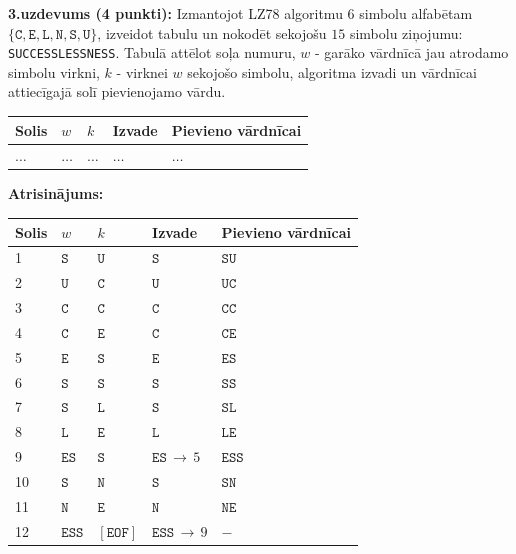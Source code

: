 \documentclass[11pt]{article}
\begin{document}
{\footnotesize
\vspace{6pt}
{\bf 3.uzdevums (4 punkti):}
Izmantojot LZ78 algoritmu 6 simbolu alfabētam $\{\mathtt{C}, \mathtt{E}, \mathtt{L}, \mathtt{N},\mathtt{S}, \mathtt{U}\}$,
izveidot tabulu un nokodēt sekojošu $15$ simbolu ziņojumu: {\tt SUCCESSLESSNESS}.
Tabulā attēlot soļa numuru, $w$ - garāko vārdnīcā jau atrodamo simbolu virkni, $k$ - virknei $w$ sekojošo simbolu, algoritma izvadi un
vārdnīcai attiecīgajā solī pievienojamo vārdu.

\begin{center}
\begin{tabular}{ |l|l|l|l|l| } \hline
Solis & $w$ & $k$ & Izvade & Pievieno vārdnīcai \\ \hline
$\ldots$ & $\ldots$ & $\ldots$ & $\ldots$ & $\ldots$ \\ \hline
\end{tabular}
\end{center}
}

\vspace{6pt}
{\bf Atrisinājums:}

\begin{center}
\begin{tabular}{ |l|l|l|l|l| } \hline
Solis & $w$ & $k$ & Izvade & Pievieno vārdnīcai \\ \hline
1 & $\mathtt{S}$ & $\mathtt{U}$ & $\mathtt{S}$ & $\mathtt{SU}$ \\
2 & $\mathtt{U}$ & $\mathtt{C}$ & $\mathtt{U}$ & $\mathtt{UC}$ \\
3 & $\mathtt{C}$ & $\mathtt{C}$ & $\mathtt{C}$ & $\mathtt{CC}$ \\
4 & $\mathtt{C}$ & $\mathtt{E}$ & $\mathtt{C}$ & $\mathtt{CE}$ \\
5 & $\mathtt{E}$ & $\mathtt{S}$ & $\mathtt{E}$ & $\mathtt{ES}$ \\
6 & $\mathtt{S}$ & $\mathtt{S}$ & $\mathtt{S}$ & $\mathtt{SS}$ \\
7 & $\mathtt{S}$ & $\mathtt{L}$ & $\mathtt{S}$ & $\mathtt{SL}$ \\
8 & $\mathtt{L}$ & $\mathtt{E}$ & $\mathtt{L}$ & $\mathtt{LE}$ \\
9 & $\mathtt{ES}$ & $\mathtt{S}$ & $\mathtt{ES}\,\rightarrow\,5$ & $\mathtt{ESS}$ \\
10 & $\mathtt{S}$ & $\mathtt{N}$ & $\mathtt{S}$ & $\mathtt{SN}$ \\
11 & $\mathtt{N}$ & $\mathtt{E}$ & $\mathtt{N}$ & $\mathtt{NE}$ \\
12 & $\mathtt{ESS} $ & $\mathtt{[EOF]}$ & $\mathtt{ESS}\,\rightarrow\,9$ & $-$ \\ \hline
\end{tabular}
\end{center}
\end{document}
